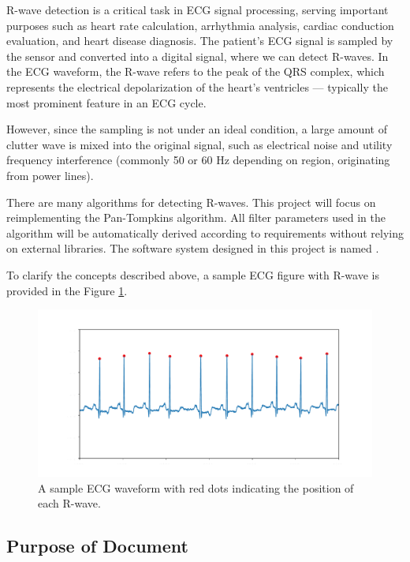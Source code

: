 \documentclass[12pt]{article}
\begin{document}
R-wave detection is a critical task in ECG signal processing, serving important
purposes such as heart rate calculation, arrhythmia analysis, cardiac conduction
evaluation, and heart disease diagnosis.  The patient's ECG signal is sampled by
the sensor and converted into a digital signal, where we can detect R-waves. In
the ECG waveform, the R-wave refers to the peak of the QRS complex, which
represents the electrical depolarization of the heart’s ventricles — typically
the most prominent feature in an ECG cycle.

However, since the sampling is not under an ideal condition, a large amount of
clutter wave is mixed into the original signal, such as electrical noise and
utility frequency interference (commonly 50 or 60 Hz depending on region,
originating from power lines).

There are many algorithms for detecting R-waves.  This project will focus on
reimplementing the Pan-Tompkins\cite{4122029} algorithm.  All filter parameters
used in the algorithm will be automatically derived according to requirements
without relying on external libraries. The software system designed in this
project is named \progname.

To clarify the concepts described above, a sample ECG figure with R-wave is
provided in the Figure \ref{Fig_Rwave}.

\begin{figure}[h!]
  \begin{center}
    \includegraphics[width=1.0\textwidth]{Rwave}
    \caption{A sample ECG waveform with red dots indicating the position of each R-wave.}
    \label{Fig_Rwave} 
  \end{center}
\end{figure}

\subsection{Purpose of Document}
\end{document}
